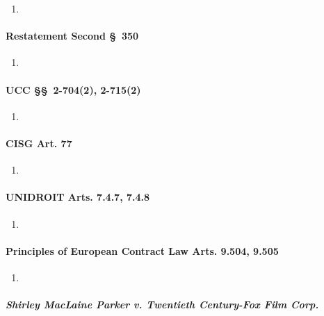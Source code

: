 \begin{enumerate}
    \item %
\end{enumerate}

\paragraph{Restatement Second \S\ 350}

\begin{enumerate}
    \item %
\end{enumerate}

\paragraph{UCC \S\S\ 2-704(2), 2-715(2)}

\begin{enumerate}
    \item %
\end{enumerate}

\paragraph{CISG Art. 77}

\begin{enumerate}
    \item %
\end{enumerate}

\paragraph{UNIDROIT Arts. 7.4.7, 7.4.8}

\begin{enumerate}
    \item %
\end{enumerate}

\paragraph{Principles of European Contract Law Arts. 9.504, 9.505}

\begin{enumerate}
    \item %
\end{enumerate}

\paragraph{\emph{Shirley MacLaine Parker v. Twentieth Century-Fox Film Corp.}}

